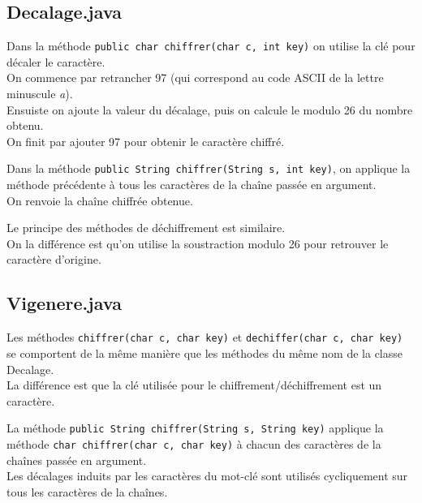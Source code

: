 \documentclass{article}
\begin{document}
\subsection{Decalage.java}
\vspace{1\baselineskip}

Dans la méthode \texttt{public char chiffrer(char c, int key)} on utilise la clé  pour décaler le caractère. \\
On commence par retrancher 97 (qui correspond au code ASCII de la lettre minuscule \textit{a}). \\
Ensuiste on ajoute la valeur du décalage, puis on calcule le modulo 26 du nombre obtenu. \\
On finit par ajouter 97 pour obtenir le caractère chiffré. \\
\vspace{1\baselineskip}

Dans la méthode \texttt{public String chiffrer(String s, int key)}, on applique la méthode précédente à tous les caractères de la chaîne passée en argument. \\
On renvoie la chaîne chiffrée obtenue. \\
\vspace{1\baselineskip}

Le principe des méthodes de déchiffrement est similaire. \\
On la différence est qu'on utilise la soustraction modulo 26 pour retrouver le caractère d'origine. \\
\vspace{2\baselineskip}

\subsection{Vigenere.java}
\vspace{1\baselineskip}

Les méthodes \texttt{chiffrer(char c, char key)} et \texttt{dechiffer(char c, char key)} se comportent de la même manière que les méthodes du même nom de la classe Decalage. \\
La différence est que la clé utilisée pour le chiffrement/déchiffrement est un caractère. \\
\vspace{1\baselineskip}

La méthode \texttt{public String chiffrer(String s, String key)} applique la méthode \texttt{char chiffrer(char c, char key)} à chacun des caractères de la chaînes passée en argument. \\
Les décalages induits par les caractères du mot-clé sont utilisés cycliquement sur tous les caractères de la chaînes. \\
\vspace{1\baselineskip}
\end{document}
